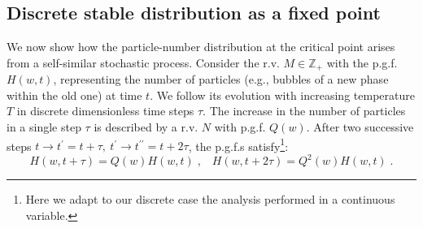 \documentclass[a4paper,12pt]{amsart}
\newcommand{\Z}{\mathbb{Z}_{+}}
\theoremstyle{definition}
\theoremstyle{remark}
\begin{document}
\subsection{Discrete stable distribution as a fixed point}
We now show how the particle-number distribution at the critical point arises from a self-similar stochastic process. Consider the r.v. $M \in \Z$ with the p.g.f. $H(w,t)$, representing the number of particles (e.g., bubbles of a new phase within the old one) at time $t$. We follow its evolution with increasing temperature $T$ in discrete dimensionless time steps $\tau$. The increase in the number of particles in a single step $\tau$ is described by a r.v. $N$ with p.g.f. $Q(w)$. After two successive steps $t\to t^{\prime} = t+\tau,~ t^{\prime} \to t^{\prime\prime} =t+2\tau$, the p.g.f.{}s  satisfy\footnote{Here we adapt to our discrete case the analysis \cite{Calvo:2010jz} performed in a continuous variable.}:
\begin{equation}
H(w, t+ \tau) = Q(w) H(w,t)\;,\;\;\; H(w, t+ 2\tau) =  Q^2(w) H(w,t)\;.
\label{rwdis}
\end{equation}
\end{document}
